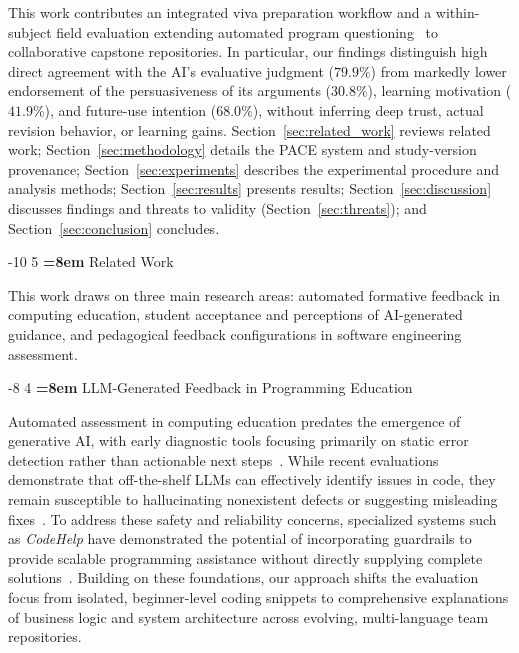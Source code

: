 \documentclass{llncs}
\makeatletter
\renewcommand\section{\@startsection{section}{1}{\z@}%
                       {-10\p@ \@plus -2\p@ \@minus -2\p@}%
                       {5\p@ \@plus 1\p@ \@minus 1\p@}%
                       {\normalfont\large\bfseries\boldmath
                        \rightskip=\z@ \@plus 8em\pretolerance=10000 }}
\renewcommand\subsection{\@startsection{subsection}{2}{\z@}%
                       {-8\p@ \@plus -2\p@ \@minus -2\p@}%
                       {4\p@ \@plus 1\p@ \@minus 1\p@}%
                       {\normalfont\normalsize\bfseries\boldmath
                        \rightskip=\z@ \@plus 8em\pretolerance=10000 }}
\makeatother
\begin{document}
This work contributes an integrated viva preparation workflow and a within-subject field evaluation extending automated program questioning~\cite{lehtinen2021lets} to collaborative capstone repositories. In particular, our findings distinguish high direct agreement with the AI's evaluative judgment ($79.9\%$) from markedly lower endorsement of the persuasiveness of its arguments ($30.8\%$), learning motivation ($41.9\%$), and future-use intention ($68.0\%$), without inferring deep trust, actual revision behavior, or learning gains. Section~\ref{sec:related_work} reviews related work; Section~\ref{sec:methodology} details the PACE system and study-version provenance; Section~\ref{sec:experiments} describes the experimental procedure and analysis methods; Section~\ref{sec:results} presents results; Section~\ref{sec:discussion} discusses findings and threats to validity (Section~\ref{sec:threats}); and Section~\ref{sec:conclusion} concludes.

\section{Related Work}
\label{sec:related}\label{sec:related_work}

This work draws on three main research areas: automated formative feedback in computing education, student acceptance and perceptions of AI-generated guidance, and pedagogical feedback configurations in software engineering assessment.

\subsection{LLM-Generated Feedback in Programming Education}

Automated assessment in computing education predates the emergence of generative AI, with early diagnostic tools focusing primarily on static error detection rather than actionable next steps~\cite{keuning2019automated}. While recent evaluations demonstrate that off-the-shelf LLMs can effectively identify issues in code, they remain susceptible to hallucinating nonexistent defects or suggesting misleading fixes~\cite{hellas2023exploring,kiesler2023exploring,dai2023can}. To address these safety and reliability concerns, specialized systems such as \textit{CodeHelp} have demonstrated the potential of incorporating guardrails to provide scalable programming assistance without directly supplying complete solutions~\cite{liffiton2023codehelp}. Building on these foundations, our approach shifts the evaluation focus from isolated, beginner-level coding snippets to comprehensive explanations of business logic and system architecture across evolving, multi-language team repositories.
\end{document}
